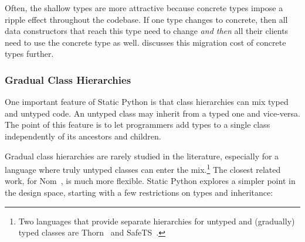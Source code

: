 \documentclass[english,cleveref,submission]{programming}
\newcommand{\SP}{Static Python}
\newcommand{\code}[1]{\texttt{#1}}
\begin{document}

Often, the shallow types are more attractive because concrete types impose
a ripple effect throughout the codebase.
If one type changes to concrete, then all data constructors that reach this type need
to change \emph{and then} all their clients need to use the concrete type as well.
 discusses this migration cost of concrete types further.


\subsubsection{Gradual Class Hierarchies}
\label{s:inheritance}

One important feature of \SP{} is that class hierarchies can
mix typed and untyped code.
An untyped class may inherit from a typed one and vice-versa.
The point of this feature is to let programmers add types to a single class
independently of its ancestors and children.


Gradual class hierarchies are rarely studied in the literature, especially
for a language where truly untyped classes can enter the mix.\footnote{Two
languages that provide separate hierarchies for untyped and (gradually) typed
classes are Thorn~\cite{wzlov-popl-2010} and SafeTS~\cite{rsfbv-popl-2015}.}
The closest related work, for Nom~\cite{mt-oopsla-2017}, is much more flexible.
\SP{} explores a simpler point in the design space, starting with
a few restrictions on types and inheritance:
\end{document}
